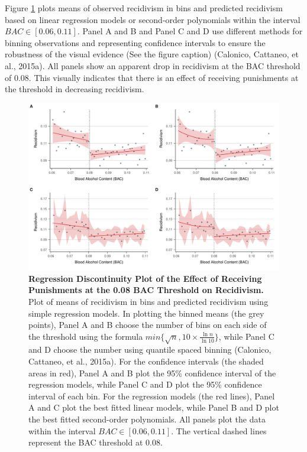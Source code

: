 \documentclass[
  11pt,
]{article}
\begin{document}
\endgroup

Figure \ref{fig:rdplot} plots means of observed recidivism in bins and
predicted recidivism based on linear regression models or second-order
polynomials within the interval \(BAC \in [0.06, 0.11]\). Panel A and B
and Panel C and D use different methods for binning observations and
representing confidence intervals to ensure the robustness of the visual
evidence (See the figure caption) (Calonico, Cattaneo, et al., 2015a).
All panels show an apparent drop in recidivism at the BAC threshold of
0.08. This visually indicates that there is an effect of receiving
punishments at the threshold in decreasing recidivism.

\begin{figure}[H]
  \centering
  \includegraphics[width=1\columnwidth]{../figures/combined.pdf}
  \caption{\textbf{Regression Discontinuity Plot of the Effect of Receiving Punishments at the 0.08 BAC Threshold on Recidivism.} Plot of means of recidivism in bins and predicted recidivism using simple regression models. In plotting the binned means (the grey points), Panel A and B choose the number of bins on each side of the threshold using the formula $min\{\sqrt{n}, 10 \times \frac{\ln{n}}{\ln{10}}\}$, while Panel C and D choose the number using quantile spaced binning (Calonico, Cattaneo, et al., 2015a). For the confidence intervals (the shaded areas in red), Panel A and B plot the 95\% confidence interval of the regression models, while Panel C and D plot the 95\% confidence interval of each bin. For the regression models (the red lines), Panel A and C plot the best fitted linear models, while Panel B and D plot the best fitted second-order polynomials. All panels plot the data within the interval $BAC \in [0.06, 0.11]$. The vertical dashed lines represent the BAC threshold at 0.08.}
  \label{fig:rdplot}
\end{figure}
\end{document}

